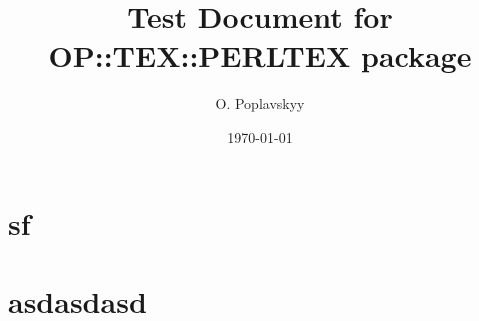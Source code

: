 \documentclass[12pt,a4paper,dvips]{report}
\title{Test Document for OP::TEX::PERLTEX package}
\date{\today}
\author{O. Poplavskyy}
\begin{document}
\chapter{sf}
\chapter{asdasdasd}
\hello

\printindex
	
\end{document}
